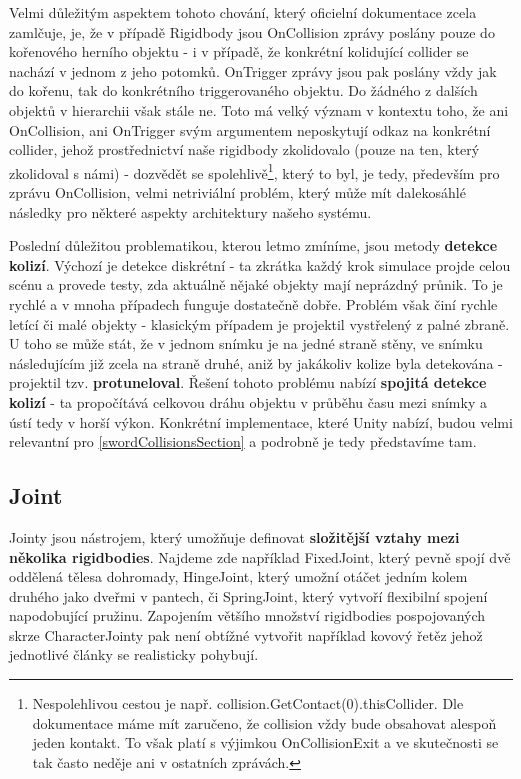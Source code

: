 Velmi důležitým aspektem tohoto chování, který oficielní dokumentace zcela zamlčuje, je, že v případě Rigidbody jsou OnCollision zprávy poslány pouze do kořenového herního objektu - i v případě, že konkrétní kolidující collider se nachází v jednom z jeho potomků. OnTrigger zprávy jsou pak poslány vždy jak do kořenu, tak do konkrétního triggerovaného objektu. Do žádného z dalších objektů v hierarchii však stále ne. Toto má velký význam v kontextu toho, že ani OnCollision, ani OnTrigger svým argumentem neposkytují odkaz na konkrétní collider, jehož prostřednictví naše rigidbody zkolidovalo (pouze na ten, který zkolidoval s námi) - dozvědět se spolehlivě\footnote{Nespolehlivou cestou je např. collision.GetContact(0).thisCollider. Dle dokumentace máme mít zaručeno, že collision vždy bude obsahovat alespoň jeden kontakt. To však platí s výjimkou OnCollisionExit a ve skutečnosti se tak často neděje ani v ostatních zprávách.}, který to byl, je tedy, především pro zprávu OnCollision, velmi netriviální problém, který může mít dalekosáhlé následky pro některé aspekty architektury našeho systému.

Poslední důležitou problematikou, kterou letmo zmíníme, jsou metody \textbf{detekce kolizí}. Výchozí je detekce diskrétní - ta zkrátka každý krok simulace projde celou scénu a provede testy, zda aktuálně nějaké objekty mají neprázdný průnik. To je rychlé a v mnoha případech funguje dostatečně dobře. Problém však činí rychle letící či malé objekty - klasickým případem je projektil vystřelený z palné zbraně. U toho se může stát, že v jednom snímku je na jedné straně stěny, ve snímku následujícím již zcela na straně druhé, aniž by jakákoliv kolize byla detekována - projektil tzv. \textbf{protuneloval}. Řešení tohoto problému nabízí \textbf{spojitá detekce kolizí} - ta propočítává celkovou dráhu objektu v průběhu času mezi snímky a ústí tedy v horší výkon. Konkrétní implementace, které Unity nabízí, budou velmi relevantní pro \ref{swordCollisionsSection} a podrobně je tedy představíme tam.

\subsection{Joint}

Jointy jsou nástrojem, který umožňuje definovat \textbf{složitější vztahy mezi několika rigidbodies}. Najdeme zde například FixedJoint, který pevně spojí dvě oddělená tělesa dohromady, HingeJoint, který umožní otáčet jedním kolem druhého jako dveřmi v pantech, či SpringJoint, který vytvoří flexibilní spojení napodobující pružinu. Zapojením většího množství rigidbodies pospojovaných skrze CharacterJointy pak není obtížné vytvořit například kovový řetěz jehož jednotlivé články se realisticky pohybují.

